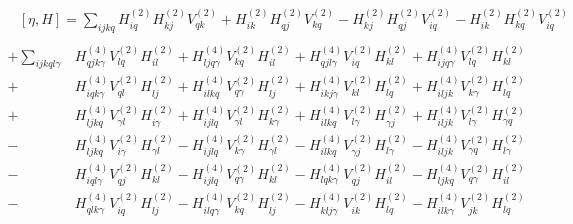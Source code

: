 \documentclass[aps,prl]{revtex4-2}
\begin{document}
    \begin{align*}
    &\left[\eta,H\right]=\sum_{ijkq}H^{\left(2\right)}_{iq}H^{\left(2\right)}_{kj}V^{\left(2\right)}_{qk}+H^{\left(2\right)}_{ik}H^{\left(2\right)}_{qj}V^{\left(2\right)}_{kq}-H^{\left(2\right)}_{kj}H^{\left(2\right)}_{qj}V^{\left(2\right)}_{iq}-H^{\left(2\right)}_{ik}H^{\left(2\right)}_{kq}V^{\left(2\right)}_{iq}\\
    \end{align*}
    \begin{align*}
    +\sum_{ijkql\gamma}&H^{\left(4\right)}_{qjk\gamma}V^{\left(2\right)}_{lq}H^{\left(2\right)}_{il} +H^{\left(4\right)}_{ljq\gamma}V^{\left(2\right)}_{kq}H^{\left(2\right)}_{il}+ H^{\left(4\right)}_{qjl\gamma}V^{\left(2\right)}_{iq}H^{\left(2\right)}_{kl} +H^{\left(4\right)}_{ijq\gamma}V^{\left(2\right)}_{lq}H^{\left(2\right)}_{kl}\\
    +&H^{\left(4\right)}_{iqk\gamma}V^{\left(2\right)}_{ql}H^{\left(2\right)}_{lj} + H^{\left(4\right)}_{ilkq}V^{\left(2\right)}_{q\gamma}H^{\left(2\right)}_{lj} +H^{\left(4\right)}_{ikj\gamma}V^{\left(2\right)}_{kl}H^{\left(2\right)}_{lq} + H^{\left(4\right)}_{iljk}V^{\left(2\right)}_{k\gamma}H^{\left(2\right)}_{lq}\\
    +&H^{\left(4\right)}_{ljkq}V^{\left(2\right)}_{\gamma l}H^{\left(2\right)}_{i\gamma}+H^{\left(4\right)}_{ijlq}V^{\left(2\right)}_{\gamma l}H^{\left(2\right)}_{k\gamma } + H^{\left(4\right)}_{ilkq}V^{\left(2\right)}_{l\gamma }H^{\left(2\right)}_{\gamma j}+ H^{\left(4\right)}_{iljk}V^{\left(2\right)}_{l\gamma }H^{\left(2\right)}_{\gamma q}\\
    -&H^{\left(4\right)}_{ljkq}V^{\left(2\right)}_{i\gamma}H^{\left(2\right)}_{\gamma l} -H^{\left(4\right)}_{ijlq}V^{\left(2\right)}_{k\gamma }H^{\left(2\right)}_{\gamma l} -H^{\left(4\right)}_{ilkq}V^{\left(2\right)}_{\gamma j}H^{\left(2\right)}_{l\gamma } -H^{\left(4\right)}_{iljk}V^{\left(2\right)}_{\gamma q}H^{\left(2\right)}_{l\gamma }\\
    -& H^{\left(4\right)}_{iql\gamma}V^{\left(2\right)}_{qj}H^{\left(2\right)}_{kl} - H^{\left(4\right)}_{ijlq}V^{\left(2\right)}_{q\gamma}H^{\left(2\right)}_{kl}- H^{\left(4\right)}_{lqk\gamma}V^{\left(2\right)}_{qj}H^{\left(2\right)}_{il} - H^{\left(4\right)}_{ljkq}V^{\left(2\right)}_{q\gamma}H^{\left(2\right)}_{il}\\
    -& H^{\left(4\right)}_{qlk\gamma}V^{\left(2\right)}_{iq}H^{\left(2\right)}_{lj} -H^{\left(4\right)}_{ilq\gamma}V^{\left(2\right)}_{kq}H^{\left(2\right)}_{lj} - H^{\left(4\right)}_{klj\gamma}V^{\left(2\right)}_{ik}H^{\left(2\right)}_{lq} -H^{\left(4\right)}_{ilk\gamma}V^{\left(2\right)}_{jk}H^{\left(2\right)}_{lq}\\

\end{align*}
\end{document}
